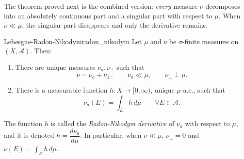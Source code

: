 \documentclass[11pt, a4paper]{article}
\begin{document}
The theorem proved next is the combined version: \emph{every} measure $\nu$ decomposes into an
absolutely continuous part and a singular part with respect to $\mu$. When $\nu \ll \mu$, the singular
part disappears and only the derivative remains.

\begin{teorema}{Lebesgue-Radon-Nikodym}{radon_nikodym}
Let $\mu$ and $\nu$ be $\sigma$-finite measures on $(X, \mathcal{A})$. Then:
\begin{enumerate}
    \item There are unique measures $\nu_a, \nu_\perp$ such that
    $$ \nu = \nu_a + \nu_\perp, \qquad \nu_a \ll \mu, \qquad \nu_\perp \perp \mu. $$
    \item There is a measurable function $h: X \to [0, \infty)$, unique $\mu$-a.e., such that
    $$ \nu_a(E) = \int_E h \, d\mu \qquad \forall E \in \mathcal{A}. $$
\end{enumerate}
The function $h$ is called the \emph{Radon-Nikodym derivative} of $\nu_a$ with respect to $\mu$, and it is
denoted $h = \dfrac{d\nu_a}{d\mu}$. In particular, when $\nu \ll \mu$, $\nu_\perp = 0$ and
$\nu(E) = \int_E h \, d\mu$.
\end{teorema}
\end{document}
